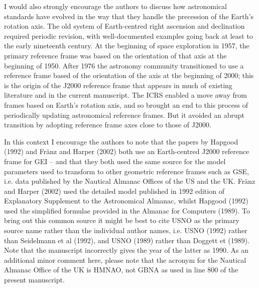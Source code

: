 \documentclass[11pt]{article}
\begin{document}
I would also strongly encourage the authors to discuss how astronomical standards have evolved in the way
that they handle the precession of the Earth’s rotation axis. The old system of Earth-centred right ascension
and declination required periodic revision, with well-documented examples going back at least to the early
nineteenth century. At the beginning of space exploration in 1957, the primary reference frame was based
on the orientation of that axis at the beginning of 1950. After 1976 the astronomy community transitioned
to use a reference frame based of the orientation of the axis at the beginning of 2000; this is the origin of the
J2000 reference frame that appears in much of existing literature and in the current manuscript. The ICRS
enabled a move away from frames based on Earth’s rotation axis, and so brought an end to this process of
periodically updating astronomical reference frames. But it avoided an abrupt transition by adopting
reference frame axes close to those of J2000.

In this context I encourage the authors to note that the papers by Hapgood (1992) and Fränz and Harper
(2002) both use an Earth-centred J2000 reference frame for GEI – and that they both used the same source
for the model parameters used to transform to other geometric reference frames such as GSE, i.e. data
published by the Nautical Almanac Offices of the US and the UK. Fränz and Harper (2002) used the detailed
model published in 1992 edition of Explanatory Supplement to the Astronomical Almanac, whilst Hapgood
(1992) used the simplified formulae provided in the Almanac for Computers (1989). To bring out this
common source it might be best to cite USNO as the primary source name rather than the individual author
names, i.e. USNO (1992) rather than Seidelmann et al (1992), and USNO (1989) rather than Doggett et
(1989). Note that the manuscript incorrectly gives the year of the latter as 1990. As an additional minor
comment here, please note that the acronym for the Nautical Almanac Office of the UK is HMNAO, not
GBNA as used in line 800 of the present manuscript.
\end{document}
